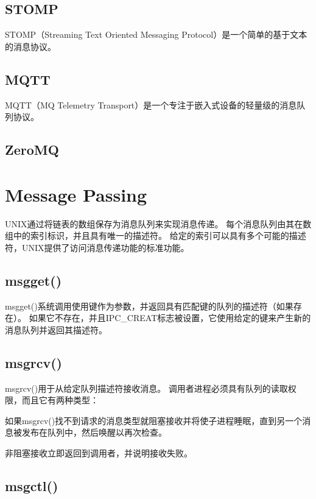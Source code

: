\subsection{STOMP}


STOMP（Streaming Text Oriented Messaging Protocol）是一个简单的基于文本的消息协议。



\subsection{MQTT}

MQTT（MQ Telemetry Transport）是一个专注于嵌入式设备的轻量级的消息队列协议。


\subsection{ZeroMQ}

\section{Message Passing}

UNIX通过将链表的数组保存为消息队列来实现消息传递。 每个消息队列由其在数组中的索引标识，并且具有唯一的描述符。 给定的索引可以具有多个可能的描述符，UNIX提供了访问消息传递功能的标准功能。

\subsection{msgget()}


msgget()系统调用使用键作为参数，并返回具有匹配键的队列的描述符（如果存在）。 如果它不存在，并且IPC\_CREAT标志被设置，它使用给定的键来产生新的消息队列并返回其描述符。


\subsection{msgrcv()}

msgrcv()用于从给定队列描述符接收消息。 调用者进程必须具有队列的读取权限，而且它有两种类型：

\begin{compactitem}
\item 如果msgrcv()找不到请求的消息类型就阻塞接收并将使子进程睡眠，直到另一个消息被发布在队列中，然后唤醒以再次检查。
\item 非阻塞接收立即返回到调用者，并说明接收失败。
\end{compactitem}

\subsection{msgctl()}

